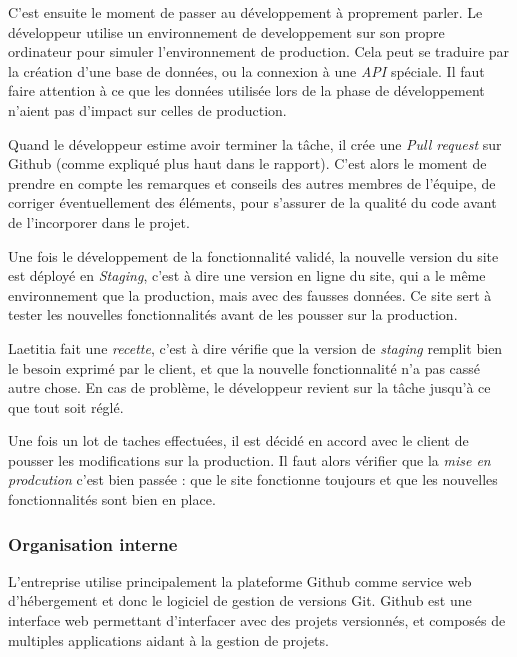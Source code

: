 \documentclass[12pt,a4paper]{article}
\begin{document}
  \bigskip

  C'est ensuite le moment de passer au développement à proprement parler.
  Le développeur utilise un environnement de developpement sur son propre
  ordinateur pour simuler l'environnement de production. Cela peut se
  traduire par la création d'une base de données, ou la connexion à une
  \emph{API} spéciale. Il faut faire attention à ce que les données
  utilisée lors de la phase de développement n'aient pas d'impact sur
  celles de production.

  \bigskip

  Quand le développeur estime avoir terminer la tâche, il crée une
  \emph{Pull request} sur Github (comme expliqué plus haut dans le
  rapport). C'est alors le moment de prendre en compte les remarques et
  conseils des autres membres de l'équipe, de corriger éventuellement des
  éléments, pour s'assurer de la qualité du code avant de l'incorporer
  dans le projet.

  \bigskip

  Une fois le développement de la fonctionnalité validé, la nouvelle
  version du site est déployé en \emph{Staging}, c'est à dire une version
  en ligne du site, qui a le même environnement que la production, mais
  avec des fausses données. Ce site sert à tester les nouvelles
  fonctionnalités avant de les pousser sur la production.

  \bigskip

  Laetitia fait une \emph{recette}, c'est à dire vérifie que la version de
  \emph{staging} remplit bien le besoin exprimé par le client, et que la
  nouvelle fonctionnalité n'a pas cassé autre chose. En cas de problème,
  le développeur revient sur la tâche jusqu'à ce que tout soit réglé.

  \bigskip

  Une fois un lot de taches effectuées, il est décidé en accord avec le
  client de pousser les modifications sur la production. Il faut alors
  vérifier que la \emph{mise en prodcution} c'est bien passée : que le
  site fonctionne toujours et que les nouvelles fonctionnalités sont bien
  en place.

  \newpage

  \subsubsection{Organisation interne}\label{organisation-interne}

  \bigskip

  L'entreprise utilise principalement la plateforme Github comme service
  web d'hébergement et donc le logiciel de gestion de versions Git. Github
  est une interface web permettant d'interfacer avec des projets
  versionnés, et composés de multiples applications aidant à la gestion de
  projets.
\end{document}
